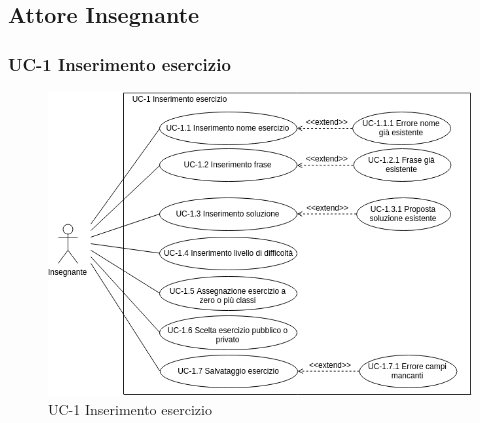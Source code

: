 \subsection{Attore Insegnante} 
\subsubsection{UC-1 Inserimento esercizio}
\begin{figure}[htbp]
	\centering
	\includegraphics[scale=0.7]{images/UC-1.png}
	\caption{UC-1 Inserimento esercizio}
\end{figure}
